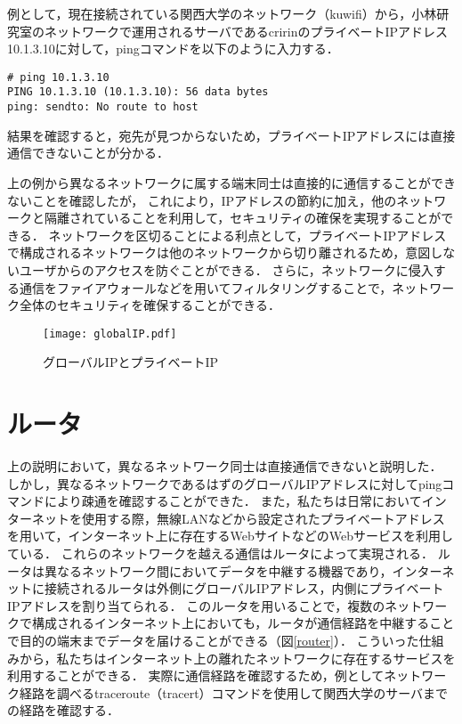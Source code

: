 例として，現在接続されている関西大学のネットワーク（kuwifi）から，小林研究室のネットワークで運用されるサーバであるcririnのプライベートIPアドレス10.1.3.10に対して，pingコマンドを以下のように入力する．
\begin{screen}
\begin{Verbatim}[frame=single]
# ping 10.1.3.10
PING 10.1.3.10 (10.1.3.10): 56 data bytes
ping: sendto: No route to host
\end{Verbatim}
\end{screen}
結果を確認すると，宛先が見つからないため，プライベートIPアドレスには直接通信できないことが分かる．\par
上の例から異なるネットワークに属する端末同士は直接的に通信することができないことを確認したが，
これにより，IPアドレスの節約に加え，他のネットワークと隔離されていることを利用して，セキュリティの確保を実現することができる．
ネットワークを区切ることによる利点として，プライベートIPアドレスで構成されるネットワークは他のネットワークから切り離されるため，意図しないユーザからのアクセスを防ぐことができる．
さらに，ネットワークに侵入する通信をファイアウォールなどを用いてフィルタリングすることで，ネットワーク全体のセキュリティを確保することができる．
\begin{figure}[tbp]
 \begin{center}
  \texttt{[image: globalIP.pdf]}
 \end{center}
 \caption{グローバルIPとプライベートIP}
 \label{glovalIP}
\end{figure}


\section{ルータ}
上の説明において，異なるネットワーク同士は直接通信できないと説明した．
しかし，異なるネットワークであるはずのグローバルIPアドレスに対してpingコマンドにより疎通を確認することができた．
また，私たちは日常においてインターネットを使用する際，無線LANなどから設定されたプライベートアドレスを用いて，インターネット上に存在するWebサイトなどのWebサービスを利用している．
これらのネットワークを越える通信はルータによって実現される．
ルータは異なるネットワーク間においてデータを中継する機器であり，インターネットに接続されるルータは外側にグローバルIPアドレス，内側にプライベートIPアドレスを割り当てられる．
このルータを用いることで，複数のネットワークで構成されるインターネット上においても，ルータが通信経路を中継することで目的の端末までデータを届けることができる（図\ref{router}）．
こういった仕組みから，私たちはインターネット上の離れたネットワークに存在するサービスを利用することができる．
実際に通信経路を確認するため，例としてネットワーク経路を調べるtraceroute（tracert）コマンドを使用して関西大学のサーバまでの経路を確認する．

